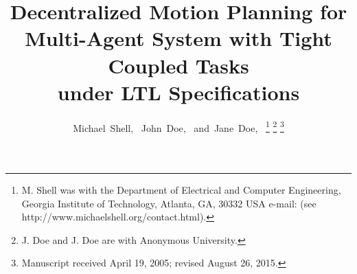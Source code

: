 \documentclass[journal]{IEEEtran}
\begin{document}

%
\title{Decentralized Motion Planning for Multi-Agent System with Tight Coupled Tasks \\under LTL Specifications}
%
%
%

\author{Michael~Shell,~
        John~Doe,~
        and~Jane~Doe,~%
\thanks{M. Shell was with the Department
of Electrical and Computer Engineering, Georgia Institute of Technology, Atlanta,
GA, 30332 USA e-mail: (see http://www.michaelshell.org/contact.html).}%
\thanks{J. Doe and J. Doe are with Anonymous University.}%
\thanks{Manuscript received April 19, 2005; revised August 26, 2015.}}

%
%
\end{document}
